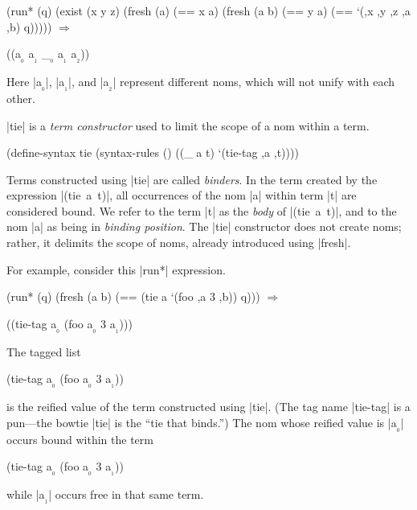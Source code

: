 \schemedisplayspace
\begin{schemedisplay}
(run* (q)
  (exist (x y z)
    (fresh (a)
      (== x a)
      (fresh (a b)
        (== y a)
        (== `(,x ,y ,z ,a ,b) q))))) $\Rightarrow$ 
\end{schemedisplay}
\nspace
\begin{schemeresponse}
((a$_{_{0}}$ a$_{_{1}}$ _$_{_{0}}$ a$_{_{1}}$ a$_{_{2}}$))
\end{schemeresponse}

\noindent Here \schemeresult|a$_{_{0}}$|,
\schemeresult|a$_{_{1}}$|, and
\schemeresult|a$_{_{2}}$|
represent different noms, which will not unify with each other.


\scheme|tie| is a \emph{term constructor} used to limit the scope
of a nom within a term.

\schemedisplayspace
\begin{schemedisplay}
(define-syntax tie
  (syntax-rules ()
    ((_ a t) `(tie-tag ,a ,t))))
\end{schemedisplay}
\noindent Terms constructed using \scheme|tie| are called \emph{binders}.
In the term created by the expression
\mbox{\scheme|(tie a t)|}, all occurrences of the nom \scheme|a|
within term \scheme|t| are considered bound.
We refer to the term \scheme|t| as the \emph{body} of \mbox{\scheme|(tie a t)|}, and to the nom \scheme|a| 
as being in \emph{binding position}.
The \scheme|tie| constructor does not create noms; 
rather, it delimits the scope of noms, 
already introduced using \scheme|fresh|.

\newpage

For example, consider this \scheme|run*| expression.

\schemedisplayspace
\begin{schemedisplay}
(run* (q)
  (fresh (a b)
    (== (tie a `(foo ,a 3 ,b)) q))) $\Rightarrow$
\end{schemedisplay}
\nspace
\begin{schemeresponse}
((tie-tag a$_{_{0}}$ (foo a$_{_{0}}$ 3 a$_{_{1}}$)))
\end{schemeresponse}

\noindent The tagged list \begin{schemeresponsebox}(tie-tag a$_{_{0}}$ (foo a$_{_{0}}$ 3 a$_{_{1}}$))\end{schemeresponsebox} is the reified value of the term constructed using \scheme|tie|.  (The tag name \scheme|tie-tag| is a pun---the bowtie \scheme|tie| is the ``tie that binds.'')  The nom whose reified value is 
\schemeresult|a$_{_{0}}$|
occurs bound within the term
\begin{schemeresponsebox}(tie-tag a$_{_{0}}$ (foo a$_{_{0}}$ 3 a$_{_{1}}$))\end{schemeresponsebox}
while \schemeresult|a$_{_{1}}$| occurs free in that same term.

